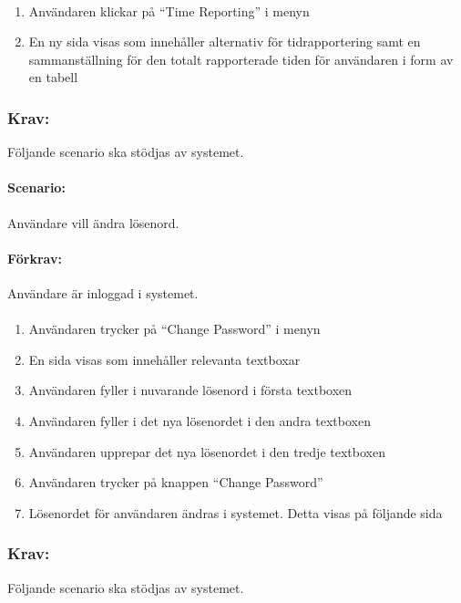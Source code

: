 \documentclass[paper=a4, fontsize=11pt,twoside]{article}
\begin{document}
	\paragraph{}
	\begin{enumerate}
		\item  Användaren klickar på “Time Reporting” i menyn
		\item  En ny sida visas som innehåller alternativ för tidrapportering samt en sammanställning för den totalt rapporterade tiden för användaren i form av en tabell
		
	\end{enumerate}
	\newpage
	\subsubsection{Krav:} Följande scenario ska stödjas av systemet.
	\paragraph{Scenario:}Användare vill ändra lösenord.
	\paragraph{Förkrav:}
	Användare är inloggad i systemet.
	\paragraph{}
	\begin{enumerate}
		\item	Användaren trycker på “Change Password” i menyn
		\item	En sida visas som innehåller relevanta textboxar
		\item	Användaren fyller i nuvarande lösenord i första textboxen
		\item	Användaren fyller i det nya lösenordet i den andra textboxen
		\item	Användaren upprepar det nya lösenordet i den tredje textboxen
		\item	Användaren trycker på knappen “Change Password”
		\item	Lösenordet för användaren ändras i systemet. Detta visas på följande sida
		
	\end{enumerate}
	
	\subsubsection{Krav:}Följande scenario ska stödjas av systemet.
\end{document}
